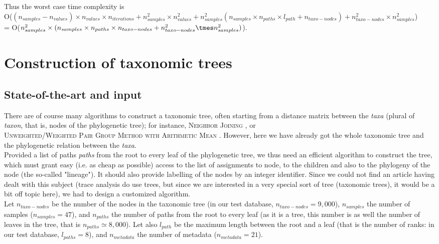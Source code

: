 \documentclass{report}
\begin{document}
Thus the worst case time complexity is\\
O($(n_{samples} - n_{values}) \times n_{values} \times n_{iterations} + n_{samples}^{2} \times n_{values}^{2} + n_{samples}^{2} (n_{samples} \times n_{paths} \times l_{path} + n_{taxo-nodes}) + n_{taxo-nodes}^{2} \times n_{samples}^{2}$)\\
= O($n_{samples}^{2} \times (n_{samples} \times n_{paths} \times n_{taxo-nodes} + n_{taxo-nodes}^{2} \tmes n_{samples}^{2})$).

\chapter{Construction of taxonomic trees}

\section{State-of-the-art and input}

There are of course many algorithms to construct a taxonomic tree, often starting from a distance matrix between the \emph{taxa} (plural of \emph{taxon}, that is, nodes of the phylogenetic tree); for instance, \textsc{Neighbor \-Joining} \cite{NeighborJoining}, or \\ \textsc{Unweighted/Weighted\- Pair \-Group\- Method\- with \-Arithmetic\- Mean\-} \cite{UMPGA}. However, here we have already got the whole taxonomic tree and the phylogenetic relation between the \emph{taxa}.\\

Provided a list of paths \emph{paths} from the root to every leaf of the phylogenetic tree, we thus need an efficient algorithm to construct the tree, which must grant easy (i.e. as cheap as possible) access to the list of assignments to node, to the children and also to the phylogeny of the node (the so-called "lineage"). It should also provide labelling of the nodes by an integer identifier. Since we could not find an article having dealt with this subject (trace analysis do use trees, but since we are interested in a very special sort of tree (taxonomic trees), it would be a bit off topic here), we had to design a customized algorithm.\\

Let $n_{taxo-nodes}$ be the number of the nodes in the taxonomic tree (in our test database, $n_{taxo-nodes} = 9,000$), $n_{samples}$ the number of samples ($n_{samples} = 47$), and $n_{paths}$ the number of paths from the root to every leaf (as it is a tree, this number is as well the number of leaves in the tree, that is $n_{paths} \simeq 8,000$). Let also $l_{path}$ be the maximum length between the root and a leaf (that is the number of ranks: in our test database, $l_{paths} = 8$), and $n_{metadata}$ the number of metadata ($n_{metadata} = 21$).\\
\end{document}
